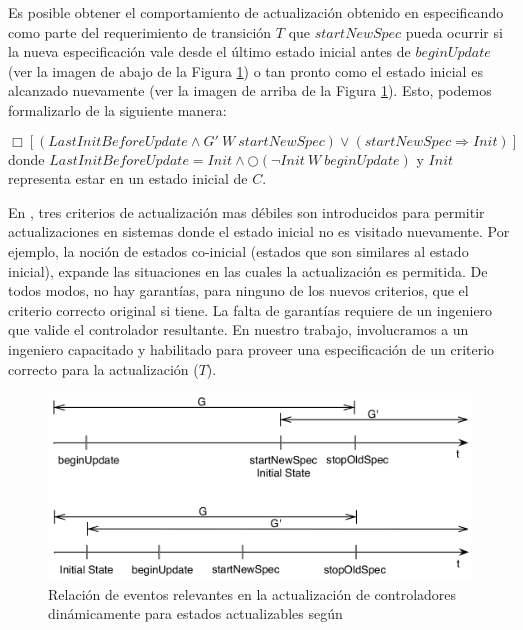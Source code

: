 Es posible obtener el comportamiento de actualización obtenido en \cite{6224401} especificando como parte del
requerimiento de transición $T$ que $startNewSpec$ pueda ocurrir si la nueva especificación vale desde el último estado
inicial antes de $beginUpdate$ (ver la imagen de abajo de la Figura \ref{ghezzi}) o tan pronto como el estado inicial es
alcanzado nuevamente (ver la imagen de arriba de la Figura \ref{ghezzi}). Esto, podemos formalizarlo de la siguiente manera:

\vspace{-1cm}
\begin{equation}
\label{ghezzi_formula}
\Box [(LastInitBeforeUpdate \wedge G'\ W\ startNewSpec) \lor (startNewSpec \Longrightarrow Init)]
\end{equation}
\noindent donde $LastInitBeforeUpdate = Init \wedge \bigcirc(\neg Init\ W\ beginUpdate)$ y $Init$ representa estar en un estado inicial de
$C$.

En \cite{PanzicaLaManna:2013:FCC:2487336.2487349}, tres criterios de actualización mas débiles son introducidos para
permitir actualizaciones en sistemas donde el estado inicial no es visitado nuevamente. Por ejemplo, la noción de
estados co-inicial (estados que son similares al estado inicial), expande las situaciones en las cuales la actualización
es permitida. De todos modos, no hay garantías, para ninguno de los nuevos criterios, que el criterio correcto original
si tiene. La falta de garantías requiere de un ingeniero que valide el controlador resultante. En nuestro trabajo,
involucramos a un ingeniero capacitado y habilitado para proveer una especificación de un criterio correcto para la
actualización ($T$).

\begin{figure}[H]
\centering
\includegraphics[scale=0.35]{img/Ghezzi.png}
\caption{Relación de eventos relevantes en la actualización de controladores dinámicamente para estados actualizables
según \cite{6224401}}
\label{ghezzi}
\end{figure}

